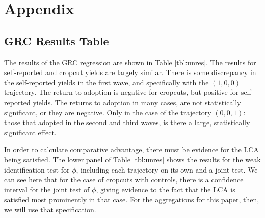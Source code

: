 \documentclass[11pt]{article}
\begin{document}






\section{Appendix}

\subsection{GRC Results Table}

The results of the GRC regression are shown in Table \ref{tbl:unres}. The results for self-reported and cropcut yields are largely similar. There is some discrepancy in the self-reported yields in the first wave, and specifically with the $(1,0,0)$ trajectory. The return to adoption is negative for cropcuts, but positive for self-reported yields. The returns to adoption in many cases, are not statistically significant, or they are negative. Only in the case of the trajectory $(0,0,1)$: those that adopted in the second and third waves, is there a large, statistically significant effect. 

In order to calculate comparative advantage, there must be evidence for the LCA being satisfied. The lower panel of  Table \ref{tbl:unres} shows the results for the weak identification test for $\phi$, including each trajectory on its own and a joint test. We can see here that for the case of cropcuts with controls, there is a confidence interval for the joint test of $\phi$, giving evidence to the fact that the LCA is satisfied most prominently in that case. For the aggregations for this paper, then, we will use that specification.

\begin{landscape}

\end{landscape}
\end{document}
